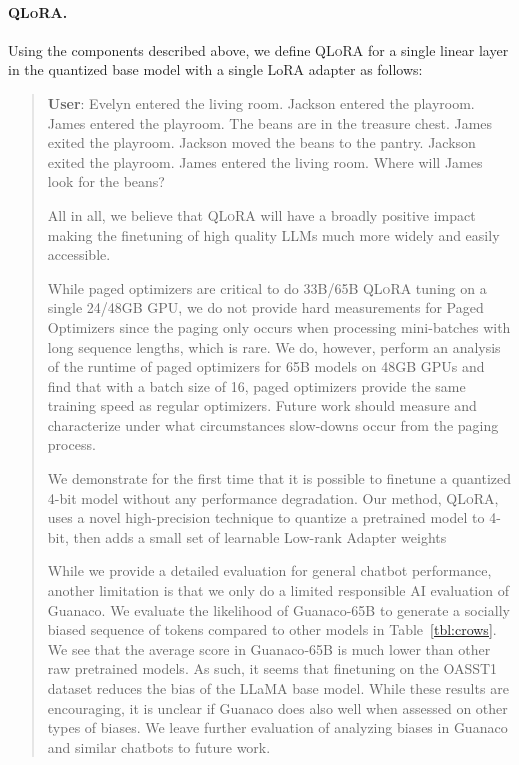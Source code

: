 \paragraph{\textsc{QLoRA}.} Using the components described above, we define \textsc{QLoRA} for a single linear layer in the quantized base model with a single LoRA adapter as follows:

\begin{quote}
    \textbf{User}: Evelyn entered the living room. Jackson entered the playroom. James entered the playroom. The beans are in the treasure chest. James exited the playroom. Jackson moved the beans to the pantry. Jackson exited the playroom. James entered the living room. Where will James look for the beans?

All in all, we believe that \textsc{QLoRA} will have a broadly positive impact making the finetuning of high quality LLMs much more widely and easily accessible.

While paged optimizers are critical to do 33B/65B \textsc{QLoRA} tuning on a single 24/48GB GPU, we do not provide hard measurements for Paged Optimizers since the paging only occurs when processing mini-batches with long sequence lengths, which is rare. We do, however, perform an analysis of the runtime of paged optimizers for 65B models on 48GB GPUs and find that with a batch size of 16, paged optimizers provide the same training speed as regular optimizers. Future work should measure and characterize under what circumstances slow-downs occur from the paging process.

We demonstrate for the first time that it is possible to finetune a quantized 4-bit model without any performance degradation. Our method, \textsc{QLoRA}, uses a novel high-precision technique to quantize a pretrained model to 4-bit, then adds a small set of learnable Low-rank Adapter weights \citep{hu2021lora} 

While we provide a detailed evaluation for general chatbot performance, another limitation is that we only do a limited responsible AI evaluation of {Guanaco}. We evaluate the likelihood of {Guanaco}-65B to generate a socially biased sequence of tokens compared to other models in Table~\ref{tbl:crows}. We see that the average score in {Guanaco}-65B is much lower than other raw pretrained models. As such, it seems that finetuning on the OASST1 dataset reduces the bias of the LLaMA base model. While these results are encouraging, it is unclear if {Guanaco} does also well when assessed on other types of biases. We leave further evaluation of analyzing biases in {Guanaco} and similar chatbots to future work.


\end{quote}
